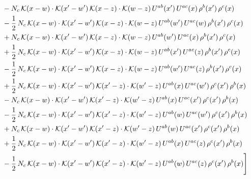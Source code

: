 \documentclass[9pt]{article}
\numberwithin{equation}{section}
\begin{document}
\begin{align}
&-N_{c}\,\mathcal{K}(x-w)\cdot\mathcal{K}(x'-w')\,\mathcal{K}(x-z)\cdot\mathcal{K}(w-z)\,U^{ab}(x')\,U^{ac}(x)\,\rho^{b}(x')\,\rho^{c}(x)\notag\\
&-\frac{1}{2}\,N_{c}\,\mathcal{K}(x-w)\cdot\mathcal{K}(x'-w')\,\mathcal{K}(x-z)\cdot\mathcal{K}(w-z)\,U^{ab}(w')\,U^{ac}(w)\,\rho^{b}(x')\,\rho^{c}(x)\notag\\
&+N_{c}\,\mathcal{K}(x-w)\cdot\mathcal{K}(x'-w')\,\mathcal{K}(x-z)\cdot\mathcal{K}(w-z)\,U^{ab}(w')\,U^{ac}(x)\,\rho^{b}(x')\,\rho^{c}(x)\notag\\
&+\frac{1}{2}\,N_{c}\,\mathcal{K}(x-w)\cdot\mathcal{K}(x'-w')\,\mathcal{K}(x-z)\cdot\mathcal{K}(w-z)\,U^{ab}(x')\,U^{ac}(z)\,\rho^{b}(x')\,\rho^{c}(x)\notag\\
&-\frac{1}{2}\,N_{c}\,\mathcal{K}(x-w)\cdot\mathcal{K}(x'-w')\,\mathcal{K}(x-z)\cdot\mathcal{K}(w-z)\,U^{ab}(w')\,U^{ac}(z)\,\rho^{b}(x')\,\rho^{c}(x)\notag\\
&+\frac{1}{2}\,N_{c}\,\mathcal{K}(x-w)\cdot\mathcal{K}(x'-w')\,\mathcal{K}(x'-z)\cdot\mathcal{K}(w'-z)\,U^{ab}(x)\,U^{ac}(w')\,\rho^{c}(x')\,\rho^{b}(x)\notag\\
&-N_{c}\,\mathcal{K}(x-w)\cdot\mathcal{K}(x'-w')\,\mathcal{K}(x'-z)\cdot\mathcal{K}(w'-z)\,U^{ab}(x)\,U^{ac}(x')\,\rho^{c}(x')\,\rho^{b}(x)\notag\\
&-\frac{1}{2}\,N_{c}\,\mathcal{K}(x-w)\cdot\mathcal{K}(x'-w')\,\mathcal{K}(x'-z)\cdot\mathcal{K}(w'-z)\,U^{ab}(w)\,U^{ac}(w')\,\rho^{c}(x')\,\rho^{b}(x)\notag\\
&+N_{c}\,\mathcal{K}(x-w)\cdot\mathcal{K}(x'-w')\,\mathcal{K}(x'-z)\cdot\mathcal{K}(w'-z)\,U^{ab}(w)\,U^{ac}(x')\,\rho^{c}(x')\,\rho^{b}(x)\notag\\
&+\frac{1}{2}\,N_{c}\,\mathcal{K}(x-w)\cdot\mathcal{K}(x'-w')\,\mathcal{K}(x'-z)\cdot\mathcal{K}(w'-z)\,U^{ab}(x)\,U^{ac}(z)\,\rho^{c}(x')\,\rho^{b}(x)\notag\\
&-\frac{1}{2}\,N_{c}\,\mathcal{K}(x-w)\cdot\mathcal{K}(x'-w')\,\mathcal{K}(x'-z)\cdot\mathcal{K}(w'-z)\,U^{ab}(w)\,U^{ac}(z)\,\rho^{c}(x')\,\rho^{b}(x)\Bigg]
\end{align}
\end{document}
